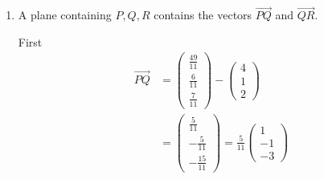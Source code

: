 \documentclass[leqno]{article}
\begin{document}
\begin{enumerate}[
  label=\textbf{\arabic*.},
  leftmargin=*,
  topsep=0pt,
  partopsep=0pt,
  parsep=0pt
]
\begin{djsSolution}
\begin{enumerate}[label=\textbf{(\alph*)}]
Substituting \((x,y,z)=(4-\lambda,\,1+\lambda,\,2+3\lambda)\) into \(-x+y+3z=-2\):
\begin{align*}
-(4-\lambda)+(1+\lambda)+3(2+3\lambda)&=-2\\
3+11\lambda&=-2\\
\lambda&=-\dfrac{5}{11}
\end{align*}

So
\begin{align*}
\overrightarrow{OQ}
&=
\begin{pmatrix}4\\1\\2\end{pmatrix}
-\frac{5}{11}
\begin{pmatrix}-1\\1\\3\end{pmatrix}\\
&=
\begin{pmatrix}
4+\frac{5}{11}\\[2pt]
1-\frac{5}{11}\\[2pt]
2-\frac{15}{11}
\end{pmatrix}\\
&=
\begin{pmatrix}
\frac{49}{11}\\[2pt]
\frac{6}{11}\\[2pt]
\frac{7}{11}
\end{pmatrix}
\end{align*}

Hence
\[
Q\left(\frac{49}{11},\frac{6}{11},\frac{7}{11}\right)
\]

  \item A plane containing \(P,Q,R\) contains the vectors \(\overrightarrow{PQ}\) and \(\overrightarrow{QR}\).

First
\begin{align*}
\overrightarrow{PQ}
&=
\begin{pmatrix}\frac{49}{11}\\[2pt]\frac{6}{11}\\[2pt]\frac{7}{11}\end{pmatrix}
-
\begin{pmatrix}4\\1\\2\end{pmatrix}\\
&=
\begin{pmatrix}
\frac{5}{11}\\[2pt]
-\frac{5}{11}\\[2pt]
-\frac{15}{11}
\end{pmatrix}
=
\frac{5}{11}
\begin{pmatrix}
1\\-1\\-3
\end{pmatrix}
\end{align*}


\end{enumerate}
\end{djsSolution}
\end{enumerate}
\end{document}
